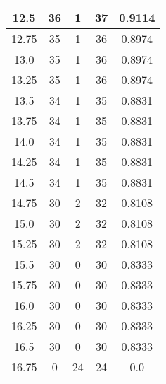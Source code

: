 \documentclass[letterpaper, 12pt]{article}
\begin{document}
\begin{longtable}{|c|c|c|c|c|}
12.5 & 36 & 1 & 37 & 0.9114 \\
\hline
12.75 & 35 & 1 & 36 & 0.8974 \\
\hline
13.0 & 35 & 1 & 36 & 0.8974 \\
\hline
13.25 & 35 & 1 & 36 & 0.8974 \\
\hline
13.5 & 34 & 1 & 35 & 0.8831 \\
\hline
13.75 & 34 & 1 & 35 & 0.8831 \\
\hline
14.0 & 34 & 1 & 35 & 0.8831 \\
\hline
14.25 & 34 & 1 & 35 & 0.8831 \\
\hline
14.5 & 34 & 1 & 35 & 0.8831 \\
\hline
14.75 & 30 & 2 & 32 & 0.8108 \\
\hline
15.0 & 30 & 2 & 32 & 0.8108 \\
\hline
15.25 & 30 & 2 & 32 & 0.8108 \\
\hline
15.5 & 30 & 0 & 30 & 0.8333 \\
\hline
15.75 & 30 & 0 & 30 & 0.8333 \\
\hline
16.0 & 30 & 0 & 30 & 0.8333 \\
\hline
16.25 & 30 & 0 & 30 & 0.8333 \\
\hline
16.5 & 30 & 0 & 30 & 0.8333 \\
\hline
16.75 & 0 & 24 & 24 & 0.0 \\
\hline
\end{longtable}
\end{document}
